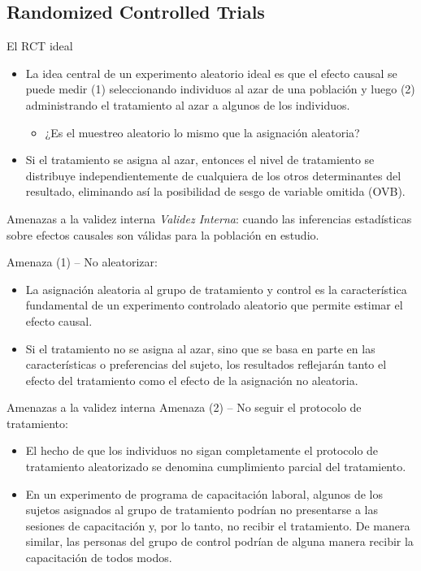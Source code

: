 \documentclass[11pt, aspectratio=169, compress]{beamer}
\begin{document}
\subsection{Randomized Controlled Trials}
\begin{frame}{El RCT ideal}
	\begin{itemize}
	\item La idea central de un experimento aleatorio ideal es que el efecto causal se puede medir (1) seleccionando individuos al azar de una población y luego (2) administrando el tratamiento al azar a algunos de los individuos.
	\begin{itemize}
		\item ¿Es el muestreo aleatorio lo mismo que la asignación aleatoria?
	\end{itemize}
	\item Si el tratamiento se asigna al azar, entonces el nivel de tratamiento se distribuye independientemente de cualquiera de los otros determinantes del resultado, eliminando así la posibilidad de sesgo de variable omitida (OVB).
	\end{itemize}
\end{frame}
\begin{frame}{Amenazas a la validez interna}
	\textit{Validez Interna}: cuando las inferencias estadísticas sobre efectos causales son válidas para la población en estudio.
	
	Amenaza (1) -- No aleatorizar:
	\begin{itemize}
		\item La asignación aleatoria al grupo de tratamiento y control es la característica fundamental de un experimento controlado aleatorio que permite estimar el efecto causal.
		
		\item Si el tratamiento no se asigna al azar, sino que se basa en parte en las características o preferencias del sujeto, los resultados reflejarán tanto el efecto del tratamiento como el efecto de la asignación no aleatoria.
	\end{itemize}
\end{frame}
\begin{frame}{Amenazas a la validez interna}
	Amenaza (2) -- No seguir el protocolo de tratamiento:
	
	\begin{itemize}
		\item El hecho de que los individuos no sigan completamente el protocolo de tratamiento aleatorizado se denomina cumplimiento parcial del tratamiento.
		\item En un experimento de programa de capacitación laboral, algunos de los sujetos asignados al grupo de tratamiento podrían no presentarse a las sesiones de capacitación y, por lo tanto, no recibir el tratamiento. De manera similar, las personas del grupo de control podrían de alguna manera recibir la capacitación de todos modos.
	\end{itemize}
\end{frame}
\end{document}
